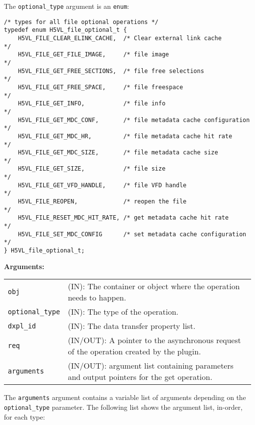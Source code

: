 The {\tt optional\_type} argument is an {\tt enum}:
\begin{lstlisting}
/* types for all file optional operations */
typedef enum H5VL_file_optional_t {
    H5VL_FILE_CLEAR_ELINK_CACHE,  /* Clear external link cache         */
    H5VL_FILE_GET_FILE_IMAGE,     /* file image                        */
    H5VL_FILE_GET_FREE_SECTIONS,  /* file free selections              */
    H5VL_FILE_GET_FREE_SPACE,     /* file freespace                    */
    H5VL_FILE_GET_INFO,           /* file info                         */
    H5VL_FILE_GET_MDC_CONF,       /* file metadata cache configuration */
    H5VL_FILE_GET_MDC_HR,         /* file metadata cache hit rate      */
    H5VL_FILE_GET_MDC_SIZE,       /* file metadata cache size          */
    H5VL_FILE_GET_SIZE,           /* file size                         */
    H5VL_FILE_GET_VFD_HANDLE,     /* file VFD handle                   */
    H5VL_FILE_REOPEN,             /* reopen the file                   */
    H5VL_FILE_RESET_MDC_HIT_RATE, /* get metadata cache hit rate       */
    H5VL_FILE_SET_MDC_CONFIG      /* set metadata cache configuration  */
} H5VL_file_optional_t;
\end{lstlisting}

\textbf{Arguments:}\\
\begin{tabular}{l p{10cm}}
  {\tt obj} & (IN): The container or object where the operation needs
  to happen.\\
  {\tt optional\_type} & (IN): The type of the operation.\\
  {\tt dxpl\_id} & (IN): The data transfer property list.\\
  {\tt req} & (IN/OUT): A pointer to the asynchronous request of the
  operation created by the plugin.\\
  {\tt arguments} & (IN/OUT): argument list containing parameters and
  output pointers for the get operation. \\
\end{tabular}

The {\tt arguments} argument contains a variable list of arguments
depending on the {\tt optional\_type} parameter. The following list
shows the argument list, in-order, for each type:

